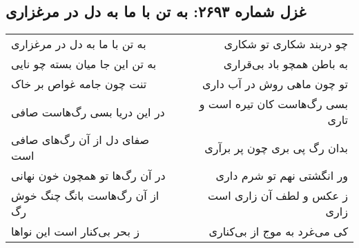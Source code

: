 \begin{center}
\section*{غزل شماره ۲۶۹۳: به تن با ما به دل در مرغزاری}
\label{sec:2693}
\begin{longtable}{l p{0.5cm} r}
به تن با ما به دل در مرغزاری
&&
چو دربند شکاری تو شکاری
\\
به تن این جا میان بسته چو نایی
&&
به باطن همچو باد بی‌قراری
\\
تنت چون جامه غواص بر خاک
&&
تو چون ماهی روش در آب داری
\\
در این دریا بسی رگ‌هاست صافی
&&
بسی رگ‌هاست کان تیره است و تاری
\\
صفای دل از آن رگ‌های صافی است
&&
بدان رگ پی بری چون پر برآری
\\
در آن رگ‌ها تو همچون خون نهانی
&&
ور انگشتی نهم تو شرم داری
\\
از آن رگ‌هاست بانگ چنگ خوش رگ
&&
ز عکس و لطف آن زاری است زاری
\\
ز بحر بی‌کنار است این نواها
&&
کی می‌غرد به موج از بی‌کناری
\\
\end{longtable}
\end{center}
